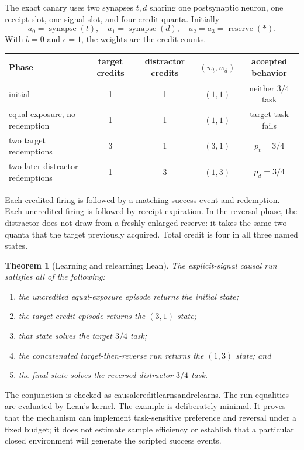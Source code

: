 \documentclass[11pt]{article}
\newtheorem{theorem}{Theorem}[section]
\newcommand{\reserve}{\operatorname{reserve}}
\newcommand{\synapse}{\operatorname{synapse}}
\newcommand{\leanname}[1]{{\scriptsize\ttfamily
  \def\_{\textunderscore\allowbreak}#1}}
\begin{document}
The exact canary uses two synapses $t,d$ sharing one postsynaptic neuron, one
receipt slot, one signal slot, and four credit quanta.  Initially
\[
  a_0=\synapse(t),\quad a_1=\synapse(d),\quad
  a_2=a_3=\reserve(\ast).
\]
With $b=0$ and $\epsilon=1$, the weights are the credit counts.

\begin{center}
\small
\begin{tabular}{@{}lcccc@{}}
\toprule
Phase & target credits & distractor credits & $(w_t,w_d)$ & accepted behavior\\
\midrule
initial & 1 & 1 & $(1,1)$ & neither $3/4$ task\\
equal exposure, no redemption & 1 & 1 & $(1,1)$ & target task fails\\
two target redemptions & 3 & 1 & $(3,1)$ & $p_t=3/4$\\
two later distractor redemptions & 1 & 3 & $(1,3)$ & $p_d=3/4$\\
\bottomrule
\end{tabular}
\end{center}

Each credited firing is followed by a matching success event and redemption.
Each uncredited firing is followed by receipt expiration.  In the reversal
phase, the distractor does not draw from a freshly enlarged reserve: it takes
the same two quanta that the target previously acquired.  Total credit is four
in all three named states.

\begin{theorem}[Learning and relearning; Lean]
The explicit-signal causal run satisfies all of the following:
\begin{enumerate}
\item the uncredited equal-exposure episode returns the initial state;
\item the target-credit episode returns the $(3,1)$ state;
\item that state solves the target $3/4$ task;
\item the concatenated target-then-reverse run returns the $(1,3)$ state; and
\item the final state solves the reversed distractor $3/4$ task.
\end{enumerate}
\end{theorem}

The conjunction is checked as
\leanname{causal\_credit\_learns\_and\_relearns}.  The run equalities are
evaluated by Lean's kernel.  The example is deliberately minimal.  It proves
that the mechanism can implement task-sensitive preference and reversal under
a fixed budget; it does not estimate sample efficiency or establish that a
particular closed environment will generate the scripted success events.
\end{document}
